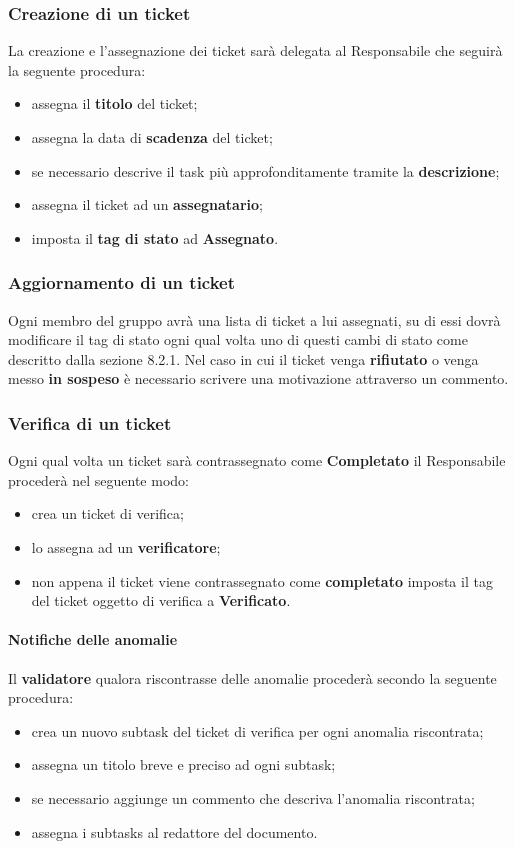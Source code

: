 		\subsubsection{Creazione di un ticket}
		La creazione e l'assegnazione dei ticket sarà delegata al Responsabile che seguirà la seguente procedura:
		\begin{itemize}
			\item assegna il \textbf{titolo} del ticket;
			\item assegna la data di \textbf{scadenza} del ticket;
			\item se necessario descrive il task più approfonditamente tramite la \textbf{descrizione};
			\item assegna il ticket ad un \textbf{assegnatario};
			\item imposta il \textbf{tag di stato} ad \textbf{Assegnato}.
		\end{itemize}
		\subsubsection{Aggiornamento di un ticket}
		Ogni membro del gruppo avrà una lista di ticket a lui assegnati, su di essi dovrà modificare il tag di stato ogni qual volta uno di questi cambi di stato come descritto dalla sezione 8.2.1. Nel caso in cui il ticket venga \textbf{rifiutato} o venga messo \textbf{in sospeso} è necessario scrivere una motivazione attraverso un commento.
		\subsubsection{Verifica di un ticket}
		Ogni qual volta un ticket sarà contrassegnato come \textbf{Completato} il Responsabile procederà nel seguente modo: 
		\begin{itemize}
			\item crea un ticket di verifica;
			\item lo assegna ad un \textbf{verificatore};
			\item non appena il ticket viene contrassegnato come \textbf{completato} imposta il tag del ticket oggetto di verifica a \textbf{Verificato}.
		\end{itemize}
		\paragraph{Notifiche delle anomalie}
		Il \textbf{validatore} qualora riscontrasse delle anomalie procederà secondo la seguente procedura:
		\begin{itemize}
			\item crea un nuovo subtask del ticket di verifica per ogni anomalia riscontrata;
			\item assegna un titolo breve e preciso ad ogni subtask;
			\item se necessario aggiunge un commento che descriva l'anomalia riscontrata;
			\item assegna i subtasks al redattore del documento.
		\end{itemize}
		